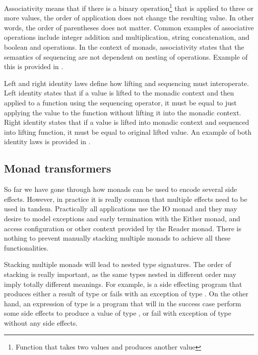 

Associativity means that if there is a binary operation\footnote{Function that takes two values and produces another value} that is applied to three or more values, the order of application does not change the resulting value. In other words, the order of parentheses does not matter. Common examples of associative operations include integer addition and multiplication, string concatenation, and boolean \inlinecode{&&} and \inlinecode{||} operations. In the context of monads, associativity states that the semantics of sequencing are not dependent on nesting of  operations. Example of this is provided in .



Left and right identity laws define how lifting and sequencing must interoperate.
Left identity states that if a value is lifted to the monadic context and then applied to a function using the sequencing operator, it must be equal to just applying the value to the function without lifting it into the monadic context. Right identity states that if a value is lifted into monadic context and sequenced into lifting function, it must be equal to original lifted value. An example of both identity laws is provided in .


\subsection{Monad transformers}\label{background:monad:monad-transformers}
So far we have gone through how monads can be used to encode several side effects. However, in practice it is really common that multiple effects need to be used in tandem. Practically all applications use the IO monad and they may desire to model exceptions and early termination with the Either monad, and access configuration or other context provided by the Reader monad. There is nothing to prevent manually stacking multiple monads to achieve all these functionalities.

Stacking multiple monads will lead to nested type signatures. The order of stacking is really important, as the same types nested in different order may imply totally different meanings. For example,  is a side effecting program that produces either a result of type  or fails with an exception of type . On the other hand, an expression of type  is a program that will in the success case perform some side effects to produce a value of type , or fail with exception of type  without any side effects.

